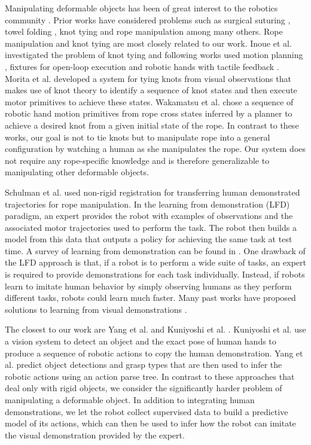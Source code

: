 \documentclass[letterpaper, 10 pt, conference]{ieeeconf}  %
\begin{document}
Manipulating deformable objects has been of great interest to the robotics community \cite{hopcroft1991case}. Prior works have considered problems such as surgical suturing \cite{mayer2008system,schulman2013warping}, towel folding \cite{maitin2010cloth},
knot tying and rope manipulation among many others. Rope manipulation and knot tying are most closely related to our work. Inoue et al. \cite{inoue1985hand} investigated the problem of knot tying and following works used motion planning \cite{saha2006motion}, fixtures for open-loop execution \cite{bell2010flexible} and robotic hands with tactile feedback \cite{yamakawa2007one}. Morita et al. \cite{morita2003knot} developed a system for tying knots from visual observations that makes use of knot theory \cite{crowell2012introduction} to identify a sequence of knot states and then execute motor primitives to achieve these states. Wakamatsu et al. \cite{wakamatsu2006knotting} chose a sequence of robotic hand motion primitives from rope cross states inferred by a planner to achieve a desired knot from a given initial state of the rope.  In contrast to these works, our goal is not to tie knots but to manipulate rope into a general configuration by watching a human as she manipulates the rope. Our system does not require any rope-specific knowledge and is therefore generalizable to  manipulating other deformable objects.  

Schulman et al. \cite{schulman2013generalization} used non-rigid registration \cite{chui2000tpsrpm} for transferring human demonstrated trajectories for rope manipulation. In the learning from demonstration (LFD) paradigm, an expert provides the robot with examples of observations and the associated motor trajectories used to perform the task. The robot then builds a model from this data that outputs a policy for achieving the same task at test time. A survey of learning from demonstration can be found in \cite{argall2009survey}. One drawback of the LFD approach is that, if a robot is to perform a wide suite of tasks, an expert is required to provide demonstrations for each task individually. Instead, if robots learn to imitate human behavior by simply observing humans as they perform different tasks, robots could learn much faster. Many past works have proposed solutions to learning from visual demonstrations \cite{lee2013syntactic,yang2015robot,kuniyoshi1994learning}.

The closest to our work are Yang et al. \cite{yang2015robot} and Kuniyoshi et al. \cite{kuniyoshi1994learning}. Kuniyoshi et al. use a vision system to detect an object and the exact pose of human hands to produce a sequence of robotic actions to copy the human demonstration. Yang et al. predict object detections and grasp types that are then used to infer the robotic actions using an action parse tree. In contrast to these approaches that deal only with rigid objects, we consider the significantly harder problem of manipulating a deformable object. In addition to integrating human demonstrations, we let the robot collect supervised data to build a predictive model of its actions, which can then be used to infer how the robot can imitate the visual demonstration provided by the expert.
\end{document}

